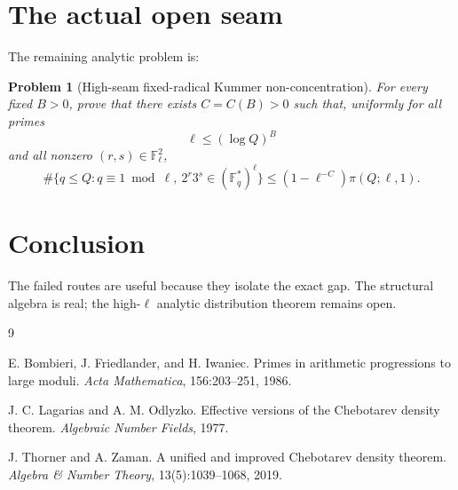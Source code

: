 \documentclass[11pt]{article}
\newtheorem{problem}{Problem}
\newcommand{\F}{\mathbb F}
\newcommand{\1}{\mathbf 1}
\begin{document}
\section{The actual open seam}

The remaining analytic problem is:

\begin{problem}[High-seam fixed-radical Kummer non-concentration]
For every fixed \(B>0\), prove that there exists \(C=C(B)>0\) such that, uniformly for all primes
\[
\ell\le(\log Q)^B
\]
and all nonzero \((r,s)\in\F_\ell^2\),
\[
\#\{q\le Q:q\equiv1\bmod\ell,\ 2^r3^s\in(\F_q^*)^\ell\}
\le
(1-\ell^{-C})\pi(Q;\ell,1).
\]
\end{problem}

\section{Conclusion}

The failed routes are useful because they isolate the exact gap.  The structural algebra is real; the high-\(\ell\) analytic distribution theorem remains open.


\begin{thebibliography}{9}

E. Bombieri, J. Friedlander, and H. Iwaniec.
\newblock Primes in arithmetic progressions to large moduli.
\newblock \emph{Acta Mathematica}, 156:203--251, 1986.

J. C. Lagarias and A. M. Odlyzko.
\newblock Effective versions of the Chebotarev density theorem.
\newblock \emph{Algebraic Number Fields}, 1977.

J. Thorner and A. Zaman.
\newblock A unified and improved Chebotarev density theorem.
\newblock \emph{Algebra \& Number Theory}, 13(5):1039--1068, 2019.

\end{thebibliography}
\end{document}

